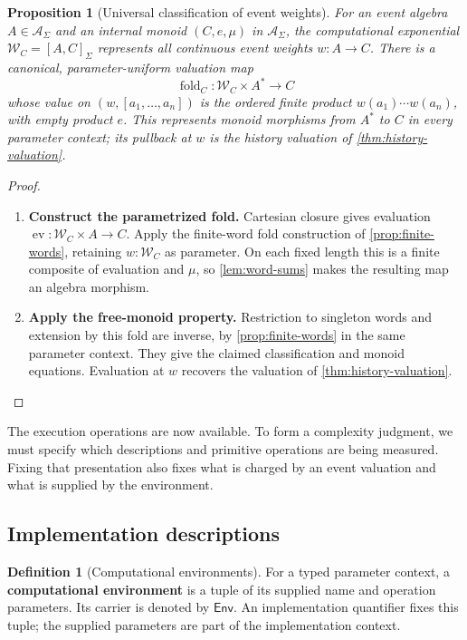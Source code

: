 \documentclass[11pt,a4paper]{article}
\numberwithin{algorithm}{section}
\numberwithin{equation}{section}
\newtheorem{proposition}[proposition]{Proposition}
\theoremstyle{definition}
\newtheorem{definition}[definition]{Definition}
\theoremstyle{remark}
\theoremstyle{plain}
\newcommand{\Env}{\mathsf{Env}}
\newcommand{\AS}{\mathcal A_{\Sigma}}
\newcommand{\ev}{\operatorname{ev}}
\theoremstyle{definition}
\theoremstyle{plain}
\begin{document}
\begin{proposition}[Universal classification of event weights]
\label{prop:universal-history-weights}
For an event algebra $A\in\AS$ and an internal monoid
$(C,e,\mu)$ in $\AS$, the computational exponential
$\mathcal W_C=[A,C]_\Sigma$ represents all continuous event
weights $w:A\to C$.  There is a canonical, parameter-uniform
valuation map
\[
 \operatorname{fold}_C:\mathcal W_C\times A^*\to C
\]
whose value on $(w,[a_1,\ldots,a_n])$ is the ordered finite
product $w(a_1)\cdots w(a_n)$, with empty product $e$.
This represents monoid morphisms from $A^*$ to $C$ in every
parameter context; its pullback at $w$ is the history valuation
of \cref{thm:history-valuation}.
\end{proposition}
\begin{proof}\leavevmode
\begin{enumerate}[leftmargin=*,align=left]
\item \textbf{Construct the parametrized fold.}
Cartesian closure gives evaluation
$\ev:\mathcal W_C\times A\to C$.
Apply the finite-word fold construction of \cref{prop:finite-words},
retaining $w:\mathcal W_C$ as parameter. On each fixed length
this is a finite composite of evaluation and $\mu$, so
\cref{lem:word-sums} makes the resulting map an algebra morphism.

\item \textbf{Apply the free-monoid property.}
Restriction to singleton words and extension by this fold are
inverse, by \cref{prop:finite-words} in the same parameter context.
They give the claimed classification and monoid equations.
Evaluation at $w$ recovers the valuation of \cref{thm:history-valuation}.
\end{enumerate}
\end{proof}

The execution operations are now available. To form a complexity
judgment, we must specify which descriptions and primitive operations
are being measured. Fixing that presentation also fixes what is charged
by an event valuation and what is supplied by the environment.

\subsection{Implementation descriptions}
\label{sec:retained-execution}
\begin{definition}[Computational environments]\label{def:computational-environments}
For a typed parameter context, a \textbf{computational environment}
is a tuple of its supplied name and operation parameters. Its carrier
is denoted by $\Env$. An implementation quantifier fixes this tuple;
the supplied parameters are part of the implementation context.
\end{definition}
\end{document}
